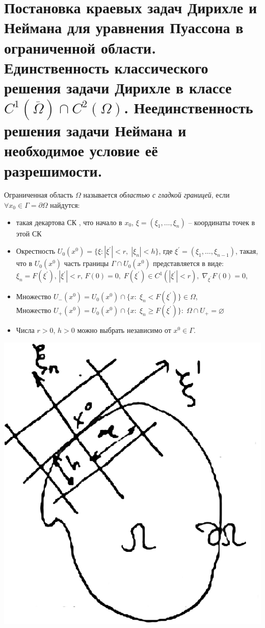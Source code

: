\documentclass[../main.tex]{subfiles}
\begin{document}
\section{Постановка краевых задач Дирихле и Неймана для уравнения Пуассона в ограниченной области. Единственность классического решения задачи Дирихле в классе $C^1(\overline{\Omega}) \cap C^2({\Omega})$. Неединственность решения задачи Неймана и необходимое условие её разрешимости.}
\begin{definition}
Ограниченная область $\Omega$ называется \textit{областью с гладкой границей}, если $\forall x_0 \in \Gamma = \partial \Omega$ найдутся:
\begin{itemize}
\item такая декартова СК , что начало в $x_0$, $\xi = (\xi_1, \ldots, \xi_n)$ -- координаты точек в этой СК
\item Окрестность $U_0(x^0) = \{\xi\colon |\xi^{'}| < r,\; |\xi_n| < h\}$, где $\xi^{'} = (\xi_1, \ldots, \xi_{n - 1})$, такая, что в $U_0(x^0)$ часть границы $\Gamma \cap U_0(x^0)$ представляется в виде: $\xi_n = F(\xi^{'}), \, |\xi^{'}| < r, \, F(0) = 0, \; F(\xi^{'}) \in C^1(|\xi^{'}| < r),\; \nabla_{\xi^{'}} F(0) = 0$, 
\item Множество $U_{-}(x^0) = U_0(x^0) \cap \{x\colon\; \xi_n < F(\xi^{'})\} \in \Omega$, \\
Множество $U_{+}(x^0) = U_0(x^0) \cap \{x\colon\; \xi_n \geq F(\xi^{'})\}\colon\; \Omega \cap U_{+} = \varnothing$
\item Числа $r > 0$, $h > 0$ можно выбрать независимо от $x^0 \in \Gamma$.
\end{itemize}
\end{definition}
\begin{minipage}{0.3\textwidth}
\begin{center}
\includegraphics[scale = 0.2]{17_1_new}
\end{center}
\end{minipage}
\end{document}
